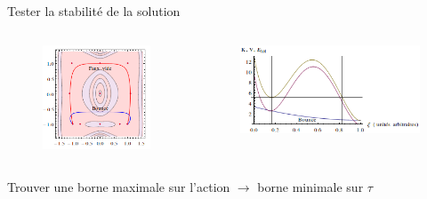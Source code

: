 \documentclass[handout]{beamer}
\begin{document}
\begin{frame}
Tester la stabilité de la solution

    \begin{columns}[T]
        \begin{column}[T]{.5\linewidth}
        \begin{figure}[0.3\textwidth]
     \includegraphics[scale=0.5]{bouncy.png}
    \end{figure}
        \end{column}
    
        \begin{column}[T]{.5\linewidth}
        \begin{figure}[0.3\textwidth]
     \includegraphics[scale=0.5]{ener.png}
    \end{figure}
        \end{column}
    \end{columns}

    
 Trouver une borne maximale sur l'action $\rightarrow$ borne minimale sur $\tau$
 
\end{frame}
\end{document}
